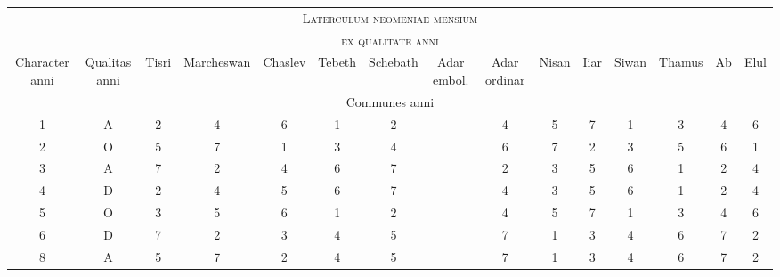 %
{
\normalsize
\centering
\setlength{\tabcolsep}{2.0pt}
\renewcommand{\arraystretch}{1.040} %
\newcommand{\hts}{\tiny}
\newcommand{\cwd}{3em}
%
\newcommand{\da}{\scriptsize{†}}
\begin{tabular}{@{} c c *{13}{c} @{}}
\toprule
\multicolumn{15}{c}{\Large\textsc{Laterculum neomeniae mensium}} \\
\multicolumn{15}{c}{\large\textsc{ex qualitate anni}} \\
\toprule
  \hts{\parbox[b]{\cwd}{\raggedright Cha\-rac\-ter an\-ni}} &
  \hts{\parbox[b]{\cwd}{\raggedright Qua\-li\-tas an\-ni}} &
  \hts{\parbox[b]{\cwd}{\raggedright Tisri}} &
  \hts{\parbox[b]{\cwd}{\raggedright Mar\-ches\-wan}} &
  \hts{\parbox[b]{\cwd}{\raggedright Chas\-lev}} &
  \hts{\parbox[b]{\cwd}{\raggedright Te\-beth}} &
  \hts{\parbox[b]{\cwd}{\raggedright Sche\-bath}} &
  \hts{\parbox[b]{\cwd}{\raggedright Adar embol.}} &
  \hts{\parbox[b]{\cwd}{\raggedright Adar ordinar}} &
  \hts{\parbox[b]{\cwd}{\raggedright Nisan}} &
  \hts{\parbox[b]{\cwd}{\raggedright Iiar}} &
  \hts{\parbox[b]{\cwd}{\raggedright Siwan}} &
  \hts{\parbox[b]{\cwd}{\raggedright Tha\-mus}} &
  \hts{\parbox[b]{\cwd}{\raggedright Ab}} &
  \hts{\parbox[b]{\cwd}{\raggedright Elul}}
\\
\midrule
\multicolumn{15}{c}{Communes anni}\\
\midrule
 1 & A & 2 & 4 & 6 & 1 & 2 & ~ & 4 & 5 & 7 & 1 & 3 & 4 & 6 \\
 2 & O & 5 & 7 & 1 & 3 & 4 & ~ & 6 & 7 & 2 & 3 & 5 & 6 & 1 \\
 3 & A & 7 & 2 & 4 & 6 & 7 & ~ & 2 & 3 & 5 & 6 & 1 & 2 & 4 \\
 4 & D & 2 & 4 & 5 & 6 & 7 & ~ & 4 & 3 & 5 & 6 & 1 & 2 & 4 \\
 5 & O & 3 & 5 & 6 & 1 & 2 & ~ & 4 & 5 & 7 & 1 & 3 & 4 & 6 \\
 6 & D & 7 & 2 & 3 & 4 & 5 & ~ & 7 & 1 & 3 & 4 & 6 & 7 & 2 \\
 8 & A & 5 & 7 & 2 & 4 & 5 & ~ & 7 & 1 & 3 & 4 & 6 & 7 & 2 \\

\end{tabular}}
